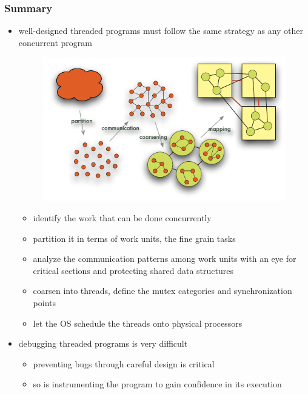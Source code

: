 \begin{frame}[fragile]
%
  \frametitle{Summary}
%
  \begin{itemize}
%
  \item well-designed threaded programs must follow the same strategy as any other concurrent
    program
    \begin{figure}
      \centering
      \includegraphics[scale=0.5]{figures/parallelization-steps.pdf}
      \label{fig:parallelization-steps}
    \end{figure}
    \vspace{-1.75em}
%
    \begin{itemize}
    \item identify the work that can be done concurrently
    \item partition it in terms of work units, the fine grain tasks
    \item analyze the communication patterns among work units with an eye for critical sections
      and protecting shared data structures
    \item coarsen into threads, define the mutex categories and synchronization points
    \item let the OS schedule the threads onto physical processors
    \end{itemize}
%
  \item debugging threaded programs is very difficult
    \begin{itemize}
    \item preventing bugs through careful design is critical
    \item so is instrumenting the program to gain confidence in its execution
    \end{itemize}
%
  \end{itemize}
%
\end{frame}

